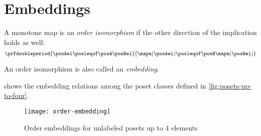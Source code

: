 \section{Embeddings}

\begin{ctdefinition}
    A monotone map is an \emph{order isomorphism} if the other direction of the implication holds as well:
    \begin{equation}
        \prfdoubleperiod{
            \posAel \posleqof\posA \posBel
        }{
            \mapa(\posAel) \posleqof\posB \mapa(\posBel)
        }
    \end{equation}
\end{ctdefinition}

An order isomorphism is also called an \emph{embedding}.

 shows the embedding relations among the poset classes defined in \cref{fig:posets-up-to-four}.

\begin{figure*}
    \texttt{[image: order-embedding]}
    \caption{Order embeddings for unlabeled posets up to 4 elements}
    \label{fig:order-embedding}
\end{figure*}
